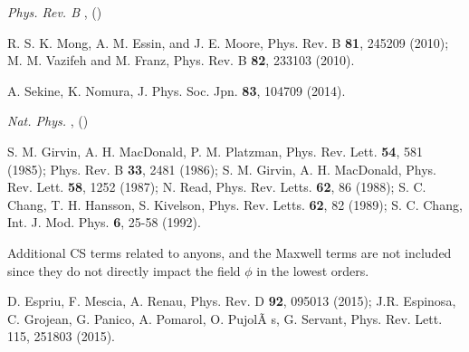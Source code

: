 \documentclass[aps,prl,showpacs,twocolumn,groupedaddress]{revtex4-1}
\begin{document}
\begin{thebibliography}{1}
	\newblock \emph{ {Phys. Rev. B}}
	\textbf{},  ()
	
       R. S. K. Mong, A. M. Essin, and J. E. Moore, Phys. Rev. B {\bf 81}, 245209 (2010); M. M. Vazifeh and M. Franz, Phys. Rev. B {\bf 82}, 233103 (2010).

        A. Sekine, K. Nomura, J. Phys. Soc. Jpn. {\bf 83}, 104709 (2014).

	\newblock \emph{ {Nat. Phys.}}
	\textbf{},  ()	
	
        S. M. Girvin, A. H. MacDonald, P. M. Platzman, Phys. Rev. Lett.  {\bf 54}, 581 (1985);  Phys. Rev. B {\bf 33}, 2481 (1986); S. M. Girvin, A. H. MacDonald, Phys. Rev. Lett. {\bf 58}, 1252 (1987); N. Read, Phys. Rev. Letts. {\bf 62}, 86 (1988); S. C. Chang, T. H. Hansson, S. Kivelson, Phys. Rev. Letts. {\bf 62}, 82 (1989); S. C. Chang, Int. J. Mod. Phys. {\bf 6}, 25-58 (1992).

	Additional CS terms related to anyons,\cite{CSGL} and the Maxwell terms are not included since they do not directly impact the field $\phi$ in the lowest orders. 

        D. Espriu, F. Mescia, A. Renau, Phys. Rev. D {\bf 92}, 095013 (2015); J.R. Espinosa, C. Grojean, G. Panico, A. Pomarol, O. PujolÃ s, G. Servant, Phys. Rev. Lett. 115, 251803 (2015). 

\end{thebibliography}
\end{document}
